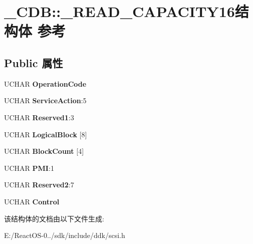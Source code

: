\hypertarget{struct___c_d_b_1_1___r_e_a_d___c_a_p_a_c_i_t_y16}{}\section{\+\_\+\+C\+DB\+:\+:\+\_\+\+R\+E\+A\+D\+\_\+\+C\+A\+P\+A\+C\+I\+T\+Y16结构体 参考}
\label{struct___c_d_b_1_1___r_e_a_d___c_a_p_a_c_i_t_y16}
\subsection*{Public 属性}
\begin{DoxyCompactItemize}
\item 
\mbox{\label{struct___c_d_b_1_1___r_e_a_d___c_a_p_a_c_i_t_y16_af33db6be4b38ce5b5a1f16b5d96ebeed}} 
U\+C\+H\+AR {\bfseries Operation\+Code}
\item 
\mbox{\label{struct___c_d_b_1_1___r_e_a_d___c_a_p_a_c_i_t_y16_ad8d14d5f8223338e204e2719e3c52138}} 
U\+C\+H\+AR {\bfseries Service\+Action}\+:5
\item 
\mbox{\label{struct___c_d_b_1_1___r_e_a_d___c_a_p_a_c_i_t_y16_ae5d23c1c0b21a1b9565189566c93b531}} 
U\+C\+H\+AR {\bfseries Reserved1}\+:3
\item 
\mbox{\label{struct___c_d_b_1_1___r_e_a_d___c_a_p_a_c_i_t_y16_a562706b8641508a956749bc9e1643e8c}} 
U\+C\+H\+AR {\bfseries Logical\+Block} \mbox{[}8\mbox{]}
\item 
\mbox{\label{struct___c_d_b_1_1___r_e_a_d___c_a_p_a_c_i_t_y16_aa37fd6f309c84dd37f9ed0f0bad3db39}} 
U\+C\+H\+AR {\bfseries Block\+Count} \mbox{[}4\mbox{]}
\item 
\mbox{\label{struct___c_d_b_1_1___r_e_a_d___c_a_p_a_c_i_t_y16_abf42cca64eabe03c21bec29bbe2e7ac5}} 
U\+C\+H\+AR {\bfseries P\+MI}\+:1
\item 
\mbox{\label{struct___c_d_b_1_1___r_e_a_d___c_a_p_a_c_i_t_y16_a533530d52bd62f5cf3fa365fca7a84e9}} 
U\+C\+H\+AR {\bfseries Reserved2}\+:7
\item 
\mbox{\label{struct___c_d_b_1_1___r_e_a_d___c_a_p_a_c_i_t_y16_a50e7da3103536a2b08774f99de3549ee}} 
U\+C\+H\+AR {\bfseries Control}
\end{DoxyCompactItemize}


该结构体的文档由以下文件生成\+:\begin{DoxyCompactItemize}
\item 
E\+:/\+React\+O\+S-\/0../sdk/include/ddk/scsi.\+h\end{DoxyCompactItemize}
